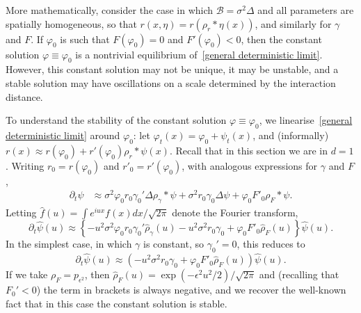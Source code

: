 \documentclass[EJP]{ejpecp} %
\renewcommand{\hat}{\widehat}
\newcommand{\DG}{\mathcal{B}}  %
\newcommand{\kernel}{\rho}  %
\newcommand{\smooth}[1]{\kernel_{#1} \! * \!}  %
\begin{document}
More mathematically, consider the case in which
$\DG = \sigma^2 \Delta$ and all 
parameters are spatially homogeneous,
so that $r(x, \eta) = r(\smooth{r}\eta(x))$, and similarly for $\gamma$ and $F$.
If $\varphi_0$ is such that $F(\varphi_0)=0$ and $F'(\varphi_0)<0$, then the
constant solution $\varphi\equiv\varphi_0$ is a nontrivial equilibrium
of~\eqref{general deterministic limit}.
However, this constant solution may not be unique, it may be unstable,
and a stable solution may have oscillations on a scale determined by the interaction distance.

To understand the stability of the constant solution $\varphi\equiv\varphi_0$, 
we linearise~\eqref{general deterministic limit} around $\varphi_0$:
let $\varphi_t(x) = \varphi_0 + \psi_t(x)$,
and (informally) $r(x) \approx r(\varphi_0) + r'(\varphi_0) \smooth{r} \psi(x)$.
Recall that in this section we are in $d=1$.
Writing $r_0 = r(\varphi_0)$ and $r'_0 = r'(\varphi_0)$,
with analogous expressions for $\gamma$ and $F$,
\begin{align*}
    \partial_t \psi
    &\approx
    \sigma^2 \varphi_0 r_0 \gamma_0' \Delta \smooth{\gamma} \psi
    + \sigma^2 r_0 \gamma_0 \Delta \psi
    + \varphi_0 F'_0 \smooth{F} \psi .
\end{align*}
Letting $\hat f(u) = \int e^{i u x} f(x) dx / \sqrt{2 \pi}$ denote the Fourier transform,
\begin{equation}
	\label{fourier transform psi}
    \partial_t \hat \psi(u)
    \approx
	\left\{
	- u^2\sigma^2 \varphi_0 r_0 \gamma_0' \hat{\rho}_\gamma(u) 
        - u^2 \sigma^2 r_0 \gamma_0
	+ \varphi_0 F'_0 \hat{\rho}_F(u) 
	\right\} \hat \psi(u) .
\end{equation}
In the simplest case, in which $\gamma$ is constant, so $\gamma_0'=0$,
this reduces to
\begin{equation} %
	\label{simplest FT}
	\partial_t \hat \psi(u)
    \approx
    \left(
        - u^2 \sigma^2 r_0 \gamma_0
	+ \varphi_0 F'_0 \hat{\rho}_F(u) 
    \right) \hat \psi(u) .
\end{equation} %
If we take $\rho_F=p_{\epsilon^2}$, then 
$\hat{\rho}_F(u)=\exp(-\epsilon^2 u^2 / 2) / \sqrt{2 \pi}$ and (recalling 
that $F_0'<0$) the term in brackets is always negative, and we recover
the well-known fact that in this case the constant solution is stable.
\end{document}
